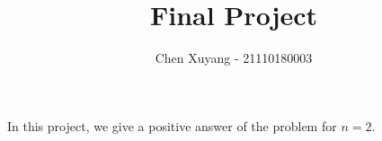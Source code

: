 \documentclass{note}
\title{Final Project}
\author{Chen Xuyang - 21110180003}
\begin{document}
  \maketitle
  In this project, we give a positive answer of the problem for $n=2$.

  \tableofcontents

  
\end{document}
